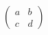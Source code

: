 \documentclass[preview,border=6pt]{standalone}
\begin{document}
\fontsize{36.000000}{43.200000}\selectfont
$\displaystyle \begin{pmatrix} a & b \\ c & d \end{pmatrix}$
\end{document}
